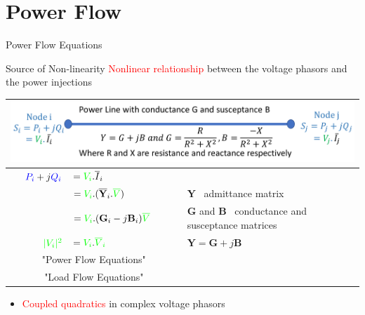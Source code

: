 \documentclass{beamer}
\begin{document}
\section{Power Flow} 
\begin{frame}{Power Flow Equations} 
\vskip -0.4cm 
 
\begin{block}{Source of Non-linearity} 
\textcolor{red}{Nonlinear relationship} between the voltage phasors and the power injections 
\end{block} 
\vskip -0.5cm 
\begin{table}[htbp!] 
\begin{tabular}{|r l| l|}  
\hline 
\multicolumn{3}{|c|}{ \includegraphics[scale=.15]{Figures/PowerFlow.png}}\\ 
\hline 
 $\textcolor{blue}{P_i}+j\textcolor{blue}{Q_i} $&$= \textcolor{green}{V_i}.\overline{I}_i$& \\ 
 &$=\textcolor{green}{V_i}.(\mathbf{\overline{Y}}_i.\textcolor{green}{\overline{V}})$&{\tiny $\mathbf{{Y}}$ \ admittance matrix}\\ 
 &$=\textcolor{green}{V_i}. (\mathbf{G}_i-j\mathbf{B}_i)\textcolor{green}{\overline{V}}$&{\tiny $\mathbf{{G}}$ and $\mathbf{{B}}$ \  conductance and susceptance matrices}\\ 
 $\textcolor{green}{|V_i|^2}$&$=\textcolor{green}{V_i}.\textcolor{green}{\overline{V}_i}$&{\tiny $\mathbf{{Y}}=\mathbf{G}+j\mathbf{B}$}\\ 
 \multicolumn{2}{|c|}{"Power Flow Equations"}&\\ 
 \multicolumn{2}{|c|}{"Load Flow Equations"}&\\ 
 \hline 
 \end{tabular} 
\end{table} 
\begin{itemize}[label={>}] 
\item \textcolor{red}{Coupled quadratics} in complex voltage phasors 
\end{itemize} 
\end{frame} 
 
\end{document}
